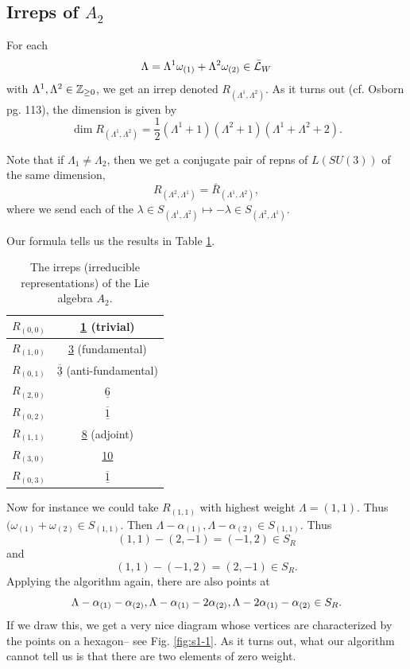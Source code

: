 \subsection*{Irreps of $A_2$} For each 
$$\Lambda=\Lambda^1 \omega_{(1)}+\Lambda^2 \omega_{(2)} \in \bar {\mathcal L}_W$$
with $\Lambda^1,\Lambda^2 \in \mathbb{Z}_{\geq 0}$, we get an irrep denoted $R_{(\Lambda^1,\Lambda^2)}$. As it turns out (cf. Osborn pg. 113), the dimension is given by
$$\dim R_{(\Lambda^1,\Lambda^2)}=\frac{1}{2}(\Lambda^1+1)(\Lambda^2+1)(\Lambda^1+\Lambda^2+2).$$

Note that if $\Lambda_1\neq \Lambda_2$, then we get a conjugate pair of repns of $L(SU(3))$ of the same dimension,
$$R_{(\Lambda^2,\Lambda^1)}=\bar R_{(\Lambda^1,\Lambda^2)},$$
where we send each of the $\lambda \in S_{(\Lambda^1,\Lambda^2)}\mapsto -\lambda \in S_{(\Lambda^2,\Lambda^1)}.$

Our formula tells us the results in Table \ref{tab:a2irreps}.
\begin{table}[]
    \centering
    \begin{tabular}{c|c}
        \\\hline
         $R_{(0,0)}$ & \underline{1} (trivial) \\ \hline
         $R_{(1,0)}$ & \underline{3} (fundamental) \\ \hline
         $R_{(0,1)}$ & $\overline{\underline{3}}$ (anti-fundamental) \\ \hline
         $R_{(2,0)}$ & $\underline{6}$ \\ \hline
         $R_{(0,2)}$ & $\overline{\underline{1}}$ \\ \hline
         $R_{(1,1)}$ & \underline{8} (adjoint) \\ \hline
         $R_{(3,0)}$ & \underline{10} \\ \hline
         $R_{(0,3)}$ & $\overline{\underline{1}}$
    \end{tabular}
    \caption{The irreps (irreducible representations) of the Lie algebra $A_2$.}
    \label{tab:a2irreps}
\end{table}
Now for instance we could take $R_{(1,1)}$ with highest weight $\Lambda=(1,1)$. Thus $(\omega_{(1)}+\omega_{(2)}\in S_{(1,1)}$. Then
$\Lambda-\alpha_{(1)},\Lambda-\alpha_{(2)}\in S_{(1,1)}.$
Thus
$$(1,1)-(2,-1)=(-1,2)\in S_R$$ and $$(1,1)-(-1,2)=(2,-1)\in S_R.$$ Applying the algorithm again, there are also points at
$$\Lambda-\alpha_{(1)}-\alpha_{(2)},\Lambda-\alpha_{(1)}-2\alpha_{(2)},\Lambda-2\alpha_{(1)}-\alpha_{(2)}\in S_R.$$
If we draw this, we get a very nice diagram whose vertices are characterized by the points on a hexagon-- see Fig. \ref{fig:s1-1}. As it turns out, what our algorithm cannot tell us is that there are two elements of zero weight.

